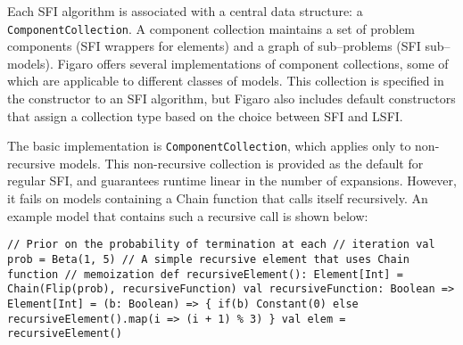 Each SFI algorithm is associated with a central data structure: a \texttt{Com\-ponentCollection}. A component collection maintains a set of problem components (SFI wrappers for elements) and a graph of sub--problems (SFI sub--models). Figaro offers several implementations of component collections, some of which are applicable to different classes of models. This collection is specified in the constructor to an SFI algorithm, but Figaro also includes default constructors that assign a collection type based on the choice between SFI and LSFI.

The basic implementation is \texttt{ComponentCollection}, which applies only to non-recursive models. This non-recursive collection is provided as the default for regular SFI, and guarantees runtime linear in the number of expansions. However, it fails on models containing a Chain function that calls itself recursively. An example model that contains such a recursive call is shown below:

\begin{flushleft}
\texttt{// Prior on the probability of termination at each
\newline // iteration
\newline val prob = Beta(1, 5)
\newline
\newline // A simple recursive element that uses Chain function
\newline // memoization
\newline def recursiveElement(): Element[Int] = Chain(Flip(prob),
\newline \tab recursiveFunction)
\newline val recursiveFunction: Boolean => Element[Int] =
\newline\tab (b: Boolean) => \{
\newline\tab\tab if(b) Constant(0)
\newline\tab\tab else recursiveElement().map(i => (i + 1) \% 3)
\newline\tab \}
\newline val elem = recursiveElement()}
\end{flushleft}

